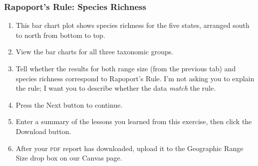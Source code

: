\documentclass[11pt]{article}
\begin{document}
\subsubsection*{Rapoport's Rule: Species Richness}

\begin{enumerate}[resume]
	\item This bar chart plot shows species richness for the five states, arranged  south to north from bottom to top.
	
	\item View the bar charts for all three taxonomic groups.
	
	\item Tell whether the results for both range size (from the previous tab) and species richness 
	correspond to Rapoport's Rule. I'm not asking you to explain the rule; I want you to describe whether
	the data \emph{match} the rule.
	
	\item Press the Next button to continue.
	
	\item Enter a summary of the lessons you learned from this exercise, then click the Download button.
	
	\item After your \textsc{pdf} report has downloaded,  upload it to the Geographic Range Size drop box on our Canvas page.
\end{enumerate}
\end{document}
